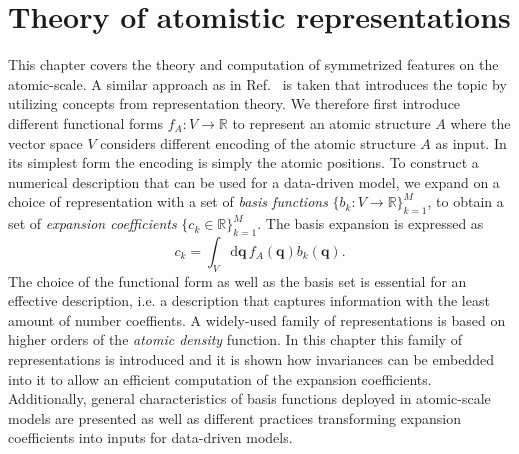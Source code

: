 \chapter{Theory of atomistic representations}
\label{sec:atomistic_representation}

This chapter covers the theory and computation of symmetrized features on the atomic-scale.
A similar approach as in Ref.~\cite{willatt2019atom} is taken that introduces the topic by utilizing concepts from representation theory.
We therefore first introduce different functional forms $f_A:V\rightarrow\mathbb{R}$ to represent an atomic structure $A$ where the vector space $V$ considers different encoding of the atomic structure $A$ as input. In its simplest form the encoding is simply the atomic positions.
To construct a numerical description that can be used for a data-driven model, we expand on a choice of representation with a set of \emph{basis functions} $\{b_k:V\rightarrow\mathbb{R}\}_{k=1}^{M}$, to obtain a set of \emph{expansion coefficients} $\{c_k\in\mathbb{R}\}_{k=1}^{M}$.
The basis expansion is expressed as
\begin{equation}
  c_k = \int_V\mathrm{d}\mathbf{q}\, f_A(\mathbf{q})b_k(\mathbf{q}).
\end{equation}
The choice of the functional form as well as the basis set is essential for an effective description, i.e. a description that captures information with the least amount of number coeffients. 
A widely-used family of representations is based on higher orders of the \emph{atomic density} function.
In this chapter this family of representations is introduced and it is shown how invariances can be embedded into it to allow an efficient computation of the expansion coefficients.
Additionally, general characteristics of basis functions deployed in atomic-scale models are presented as well as different practices transforming expansion coefficients into inputs for data-driven models.
 
